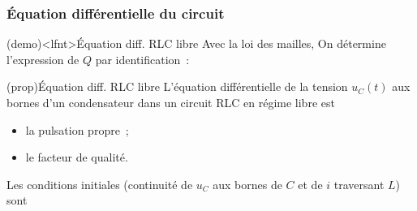 \documentclass[../../main/main.tex]{subfiles}
\begin{document}
\subsubsection{Équation différentielle du circuit}
\begin{tcb}[label=demo:eqdiffrc, sidebyside](demo)<lfnt>{Équation diff. RLC libre}
	Avec la loi des mailles,
	\tcblower
	On détermine l'expression de $Q$ par identification~:
\end{tcb}
\begin{tcb}[label=prop:eqdiffrc, sidebyside,
		righthand ratio=.4](prop){Équation diff. RLC libre}
	L'équation différentielle de la tension $u_C(t)$ aux bornes d'un
	condensateur dans un circuit RLC en régime libre est
	\psw{
		\[
			\boxed{\dv[2]{u_C}{t} + \frac{\w_0}{Q} \dv{u_C}{t} + \w_0{}^2u_C = 0}
		\]
	}
	\begin{itemize}
		\item {} la pulsation propre~;
		\item {} le facteur de
		      qualité.
	\end{itemize}
	\tcblower
	Les conditions initiales (continuité de $u_C$ aux bornes de $C$
	et de $i$ traversant $L$) sont
\end{tcb}
\end{document}
